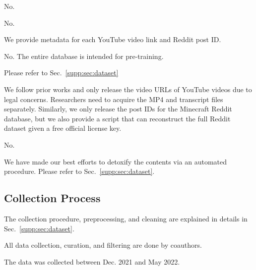  No.

 No. 

 We provide metadata for each YouTube video link and Reddit post ID. 

 No. The entire database is intended for pre-training.

 Please refer to Sec.~\ref{supp:sec:dataset}

 We follow prior works \cite{kay2017kinetics} and only release the video URLs of YouTube videos due to legal concerns. Researchers need to acquire the MP4 and transcript files separately. Similarly, we only release the post IDs for the Minecraft Reddit database, but we also provide a script that can reconstruct the full Reddit dataset given a free official license key. 

 No. 

 We have made our best efforts to detoxify the contents via an automated procedure. Please refer to Sec.~\ref{supp:sec:dataset}.

\subsection{Collection Process}

The collection procedure, preprocessing, and cleaning are explained in details in Sec.~\ref{supp:sec:dataset}.

 All data collection, curation, and filtering are done by \minedojo coauthors. 

 The data was collected between Dec. 2021 and May 2022.

